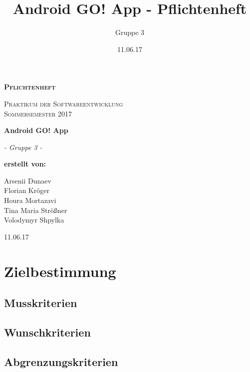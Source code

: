 \documentclass[parskip=full]{scrartcl}
\title{Android GO! App - Pflichtenheft}
\author{Gruppe 3}
\date{11.06.17}
\begin{document}
\begin{titlepage}
	\begin{center}
	{\scshape\LARGE \bfseries Pflichtenheft \par}
	\vspace{1cm}
	{\scshape\Large Praktikum der Softwareentwicklung \\ Sommersemester 2017\par}
	\vspace{1.5cm}
	{\huge\bfseries Android GO! App\par}
	\vspace{2cm}
	{\Large\itshape - Gruppe 3 -\par}
	\vfill
	{\bfseries erstellt von:\par}
	Arsenii Dunaev \\
	Florian Kröger \\
	Houra Mortazavi \\ %
	Tina Maria Strößner \\
	Volodymyr Shpylka \\	
	\vfill
	{\large 11.06.17 \par}	
	\end{center}
\end{titlepage}

\tableofcontents


\section{Zielbestimmung}


\subsection{Musskriterien}

	
\subsection{Wunschkriterien}

\subsection{Abgrenzungskriterien}
\end{document}
